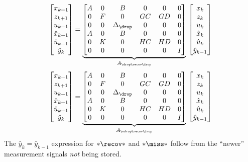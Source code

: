 %
\begin{equation}
    \begin{bmatrix}
        x_{k+1} \\
        z_{k+1} \\
        u_{k+1} \\
        \hat x_{k+1} \\
        \hat u_{k+1} \\
        \hat y_{k} \\
    \end{bmatrix} = \underbrace{\begin{bmatrix}
        A & 0 & B & 0 & 0 & 0 \\
        0 & F & 0 & GC & GD & 0 \\
        0 & 0 & \Delta_\drop & 0 & 0 & 0 \\
        A & 0 & B & 0 & 0 & 0 \\
        0 & K & 0 & HC & HD & 0 \\
        0 & 0 & 0 & 0 & 0 & I
    \end{bmatrix}}_{A_{\drop\recov\drop}}\, \begin{bmatrix}
        x_{k} \\
        z_{k} \\
        u_{k} \\
        \hat x_{k} \\
        \hat u_{k} \\
        \hat y_{k-1} \\
    \end{bmatrix}
\end{equation}
%
\begin{equation}
    \begin{bmatrix}
        x_{k+1} \\
        z_{k+1} \\
        u_{k+1} \\
        \hat x_{k+1} \\
        \hat u_{k+1} \\
        \hat y_{k} \\
    \end{bmatrix} = \underbrace{\begin{bmatrix}
        A & 0 & B & 0 & 0 & 0 \\
        0 & F & 0 & GC & GD & 0 \\
        0 & 0 & \Delta_\drop & 0 & 0 & 0 \\
        A & 0 & B & 0 & 0 & 0 \\
        0 & K & 0 & HC & HD & 0 \\
        0 & 0 & 0 & 0 & 0 & I
    \end{bmatrix}}_{A_{\ndrop\recov\drop}}\, \begin{bmatrix}
        x_{k} \\
        z_{k} \\
        u_{k} \\
        \hat x_{k} \\
        \hat u_{k} \\
        \hat y_{k-1} \\
    \end{bmatrix}
\end{equation}
%
The $\hat y_k = \hat y_{k-1}$ expression for $*\recov*$ and $*\miss*$ follow from the ``newer'' measurement signals \emph{not} being stored.

